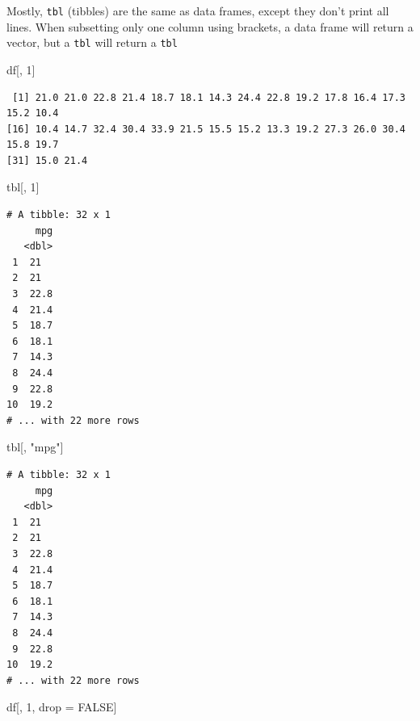\documentclass[
]{article}
\newenvironment{Shaded}{\begin{snugshade}}{\end{snugshade}}
\newcommand{\ConstantTok}[1]{\textcolor[rgb]{0.00,0.00,0.00}{#1}}
\newcommand{\DecValTok}[1]{\textcolor[rgb]{0.00,0.00,0.81}{#1}}
\newcommand{\NormalTok}[1]{#1}
\newcommand{\OtherTok}[1]{\textcolor[rgb]{0.56,0.35,0.01}{#1}}
\newcommand{\StringTok}[1]{\textcolor[rgb]{0.31,0.60,0.02}{#1}}
\begin{document}
Mostly, \texttt{tbl} (tibbles) are the same as data frames, except they
don't print all lines. When subsetting only one column using brackets, a
data frame will return a vector, but a \texttt{tbl} will return a
\texttt{tbl}

\begin{Shaded}
\begin{Highlighting}[]
\NormalTok{df[, }\DecValTok{1}\NormalTok{]}
\end{Highlighting}
\end{Shaded}

\begin{verbatim}
 [1] 21.0 21.0 22.8 21.4 18.7 18.1 14.3 24.4 22.8 19.2 17.8 16.4 17.3 15.2 10.4
[16] 10.4 14.7 32.4 30.4 33.9 21.5 15.5 15.2 13.3 19.2 27.3 26.0 30.4 15.8 19.7
[31] 15.0 21.4
\end{verbatim}

\begin{Shaded}
\begin{Highlighting}[]
\NormalTok{tbl[, }\DecValTok{1}\NormalTok{]}
\end{Highlighting}
\end{Shaded}

\begin{verbatim}
# A tibble: 32 x 1
     mpg
   <dbl>
 1  21  
 2  21  
 3  22.8
 4  21.4
 5  18.7
 6  18.1
 7  14.3
 8  24.4
 9  22.8
10  19.2
# ... with 22 more rows
\end{verbatim}

\begin{Shaded}
\begin{Highlighting}[]
\NormalTok{tbl[, }\StringTok{"mpg"}\NormalTok{]}
\end{Highlighting}
\end{Shaded}

\begin{verbatim}
# A tibble: 32 x 1
     mpg
   <dbl>
 1  21  
 2  21  
 3  22.8
 4  21.4
 5  18.7
 6  18.1
 7  14.3
 8  24.4
 9  22.8
10  19.2
# ... with 22 more rows
\end{verbatim}

\begin{Shaded}
\begin{Highlighting}[]
\NormalTok{df[, }\DecValTok{1}\NormalTok{, drop }\OtherTok{=} \ConstantTok{FALSE}\NormalTok{]}
\end{Highlighting}
\end{Shaded}
\end{document}
